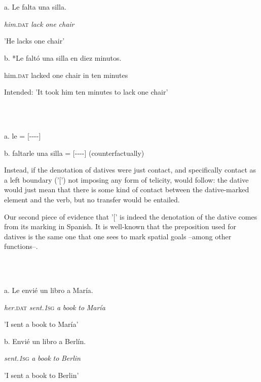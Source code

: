 \documentclass[output=paper,modfonts,nonflat]{langsci/langscibook}
\begin{document}
\ea%
    \label{ex:key:19}
    \gll\\
        \\
    \glt
    \z

          a. Le       falta   una silla.

        \textit{him.}\textsc{dat}  \textit{lack}  \textit{one} \textit{chair}

      {}'He lacks one chair'    

      b. *Le           faltó     una silla  en diez minutos.

              him.\textsc{dat}    lacked  one chair in  ten  minutes

      Intended: 'It took him ten minutes to lack one chair'

\ea%
    \label{ex:key:20}
    \gll\\
        \\
    \glt
    \z

          a. le              =     [-{}-{}-{}-]

      b. faltarle una silla    =    [-{}-{}-{}-] (counterfactually)

Instead, if the denotation of datives were just contact, and specifically contact as a left boundary ('[') not imposing any form of telicity,  would follow: the dative would just mean that there is some kind of contact between the dative-marked element and the verb, but no transfer would be entailed. 

Our second piece of evidence that '[' is indeed the denotation of the dative comes from its marking in Spanish. It is well-known that the preposition used for datives  is the same one that one sees to mark spatial goals  –among other functions–.

\ea%
    \label{ex:key:21}
    \gll\\
        \\
    \glt
    \z

          a.   Le     envié     un libro  a  María.

           \textit{her.}\textsc{dat}  \textit{sent.1}\textsc{sg}     \textit{a}   \textit{book} \textit{to} \textit{María}

      {}'I sent a book to María'

    b.   Envié     un libro a  Berlín.

        \textit{sent.1}\textsc{sg}    \textit{a}  \textit{book} \textit{to} \textit{Berlin}

      {}'I sent a book to Berlin'
\end{document}
